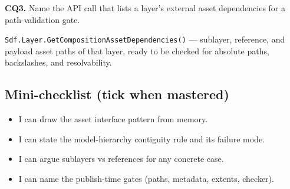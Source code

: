 \noindent\textbf{CQ3.} Name the API call that lists a layer's external asset
dependencies for a path-validation gate.
\begin{DrillSolution}
\texttt{Sdf.Layer.GetCompositionAssetDependencies()} --- sublayer, reference,
and payload asset paths of that layer, ready to be checked for absolute
paths, backslashes, and resolvability.
\end{DrillSolution}

\subsection*{Mini-checklist (tick when mastered)}
\begin{itemize}[leftmargin=*]
  \item[$\square$] I can draw the asset interface pattern from memory.
  \item[$\square$] I can state the model-hierarchy contiguity rule and its failure mode.
  \item[$\square$] I can argue sublayers vs references for any concrete case.
  \item[$\square$] I can name the publish-time gates (paths, metadata, extents, checker).
\end{itemize}
